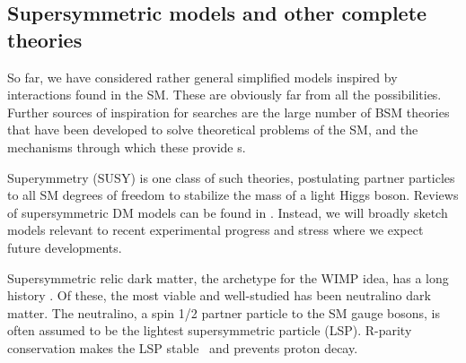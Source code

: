 

\subsection{Supersymmetric models and other complete theories}
\label{sec:SUSYModels}

So far, we have considered rather general simplified models inspired by interactions found in the SM. These are obviously far from all the possibilities. %
 Further sources of inspiration for searches are the large number of BSM theories that have been developed to solve theoretical problems of the SM, and the mechanisms through which these provide {\IP}s. 

Superymmetry (SUSY) is one class of such theories, postulating partner particles to all SM degrees of freedom to stabilize
the mass of a light Higgs boson.  
Reviews of supersymmetric DM models can be found in \cite{Feng:2010gw}. %
Instead, we will broadly sketch models relevant to
recent experimental progress and stress where we expect future developments. 

Supersymmetric relic dark matter, the archetype for the WIMP idea, has a long
history \cite{1984NuPhB.238..453E}. Of these, the most viable and well-studied has been neutralino dark matter. 
The neutralino, a spin 1/2 partner particle to the SM gauge bosons, is often assumed to be the lightest supersymmetric particle (LSP). 
R-parity conservation makes the LSP stable~\cite{Farrar:1978xj} and prevents proton decay. 

